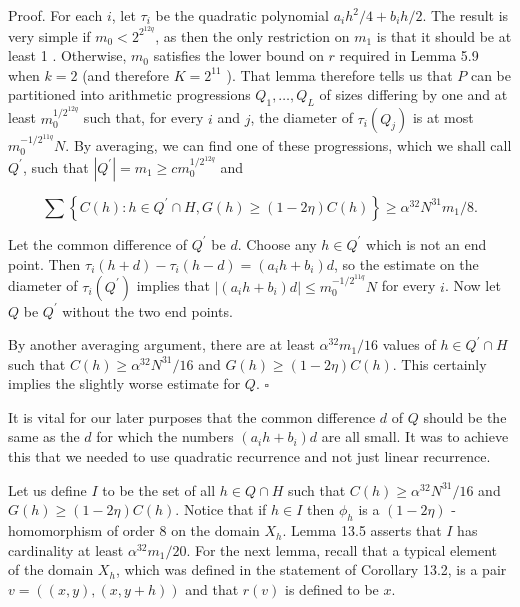 \documentclass[10pt]{article}
\begin{document}
Proof. For each $i$, let $\tau_{i}$ be the quadratic polynomial $a_{i} h^{2} / 4+b_{i} h / 2$. The result is very simple if $m_{0}<2^{2^{12 q}}$, as then the only restriction on $m_{1}$ is that it should be at least 1 . Otherwise, $m_{0}$ satisfies the lower bound on $r$ required in Lemma 5.9 when $k=2$ (and therefore $K=2^{11}$ ). That lemma therefore tells us that $P$ can be partitioned into arithmetic progressions $Q_{1}, \ldots, Q_{L}$ of sizes differing by one and at least $m_{0}^{1 / 2^{12 q}}$ such that, for every $i$ and $j$, the diameter of $\tau_{i}\left(Q_{j}\right)$ is at most $m_{0}^{-1 / 2^{11 q}} N$. By averaging, we can find one of these progressions, which we shall call $Q^{\prime}$, such that $\left|Q^{\prime}\right|=m_{1} \geqslant c m_{0}^{1 / 2^{12 q}}$ and

$$
\sum\left\{C(h): h \in Q^{\prime} \cap H, G(h) \geqslant(1-2 \eta) C(h)\right\} \geqslant \alpha^{32} N^{31} m_{1} / 8 .
$$

Let the common difference of $Q^{\prime}$ be $d$. Choose any $h \in Q^{\prime}$ which is not an end point. Then $\tau_{i}(h+d)-\tau_{i}(h-d)=\left(a_{i} h+b_{i}\right) d$, so the estimate on the diameter of $\tau_{i}\left(Q^{\prime}\right)$ implies that $\left|\left(a_{i} h+b_{i}\right) d\right| \leqslant m_{0}^{-1 / 2^{11 q}} N$ for every $i$. Now let $Q$ be $Q^{\prime}$ without the two end points.

By another averaging argument, there are at least $\alpha^{32} m_{1} / 16$ values of $h \in Q^{\prime} \cap H$ such that $C(h) \geqslant \alpha^{32} N^{31} / 16$ and $G(h) \geqslant(1-2 \eta) C(h)$. This certainly implies the slightly worse estimate for $Q$. \(\square\)

It is vital for our later purposes that the common difference $d$ of $Q$ should be the same as the $d$ for which the numbers $\left(a_{i} h+b_{i}\right) d$ are all small. It was to achieve this that we needed to use quadratic recurrence and not just linear recurrence.

Let us define $I$ to be the set of all $h \in Q \cap H$ such that $C(h) \geqslant \alpha^{32} N^{31} / 16$ and $G(h) \geqslant(1-2 \eta) C(h)$. Notice that if $h \in I$ then $\phi_{h}$ is a $(1-2 \eta)$ -homomorphism of order 8 on the domain $X_{h}$. Lemma 13.5 asserts that $I$ has cardinality at least $\alpha^{32} m_{1} / 20$. For the next lemma, recall that a typical element of the domain $X_{h}$, which was defined in the statement of Corollary 13.2, is a pair $v=((x, y),(x, y+h))$ and that $r(v)$ is defined to be $x$.
\end{document}
